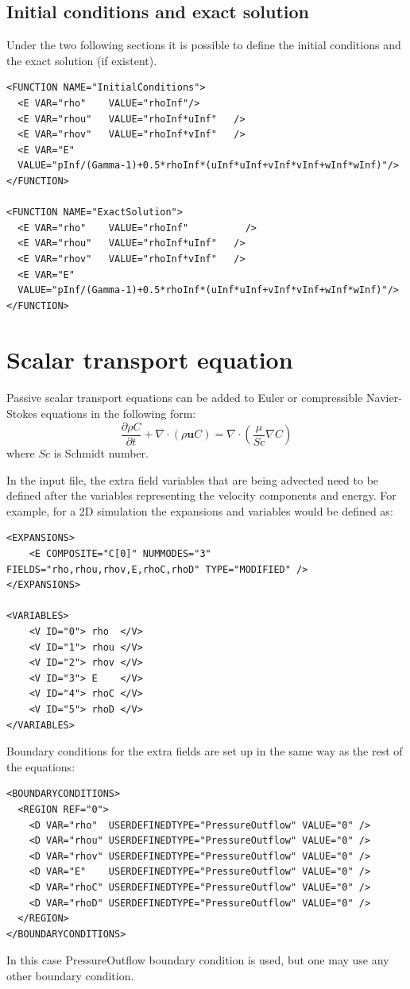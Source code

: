 \subsection*{Initial conditions and exact solution}
Under the two following sections it is possible to define the initial conditions and the exact solution (if existent).
\begin{lstlisting}[style=XmlStyle]
<FUNCTION NAME="InitialConditions">
  <E VAR="rho"    VALUE="rhoInf"/>
  <E VAR="rhou"   VALUE="rhoInf*uInf"   />
  <E VAR="rhov"   VALUE="rhoInf*vInf"   />
  <E VAR="E"
  VALUE="pInf/(Gamma-1)+0.5*rhoInf*(uInf*uInf+vInf*vInf+wInf*wInf)"/>
</FUNCTION>

<FUNCTION NAME="ExactSolution">
  <E VAR="rho"    VALUE="rhoInf"          />
  <E VAR="rhou"   VALUE="rhoInf*uInf"   />
  <E VAR="rhov"   VALUE="rhoInf*vInf"   />
  <E VAR="E"
  VALUE="pInf/(Gamma-1)+0.5*rhoInf*(uInf*uInf+vInf*vInf+wInf*wInf)"/>
</FUNCTION>
\end{lstlisting}

\section{Scalar transport equation}
Passive scalar transport equations can be added to Euler or compressible Navier-Stokes equations in the following form:
\begin{equation}
\dfrac{\partial \rho C }{\partial t} + \nabla \cdot (\rho \mathbf{u} C ) = \nabla \cdot \left(\dfrac{\mu}{Sc} \nabla C \right)
\end{equation}
where $Sc$ is Schmidt number. 

In the input file, the extra field variables that are being advected need to be defined after the variables
representing the velocity components and energy. For example, for
a 2D simulation the expansions and variables would be defined as:
\begin{lstlisting}[style=XMLStyle]
<EXPANSIONS>
    <E COMPOSITE="C[0]" NUMMODES="3" FIELDS="rho,rhou,rhov,E,rhoC,rhoD" TYPE="MODIFIED" />
</EXPANSIONS>

<VARIABLES>
    <V ID="0"> rho  </V>
    <V ID="1"> rhou </V>
    <V ID="2"> rhov </V>
    <V ID="3"> E    </V>
    <V ID="4"> rhoC </V>
    <V ID="5"> rhoD </V>
</VARIABLES>
\end{lstlisting}

Boundary conditions for the extra fields are set up in the same way as the rest of the equations:
\begin{lstlisting}[style=XMLStyle]
<BOUNDARYCONDITIONS>
  <REGION REF="0">
    <D VAR="rho"  USERDEFINEDTYPE="PressureOutflow" VALUE="0" />
    <D VAR="rhou" USERDEFINEDTYPE="PressureOutflow" VALUE="0" />
    <D VAR="rhov" USERDEFINEDTYPE="PressureOutflow" VALUE="0" />
    <D VAR="E"    USERDEFINEDTYPE="PressureOutflow" VALUE="0" />
    <D VAR="rhoC" USERDEFINEDTYPE="PressureOutflow" VALUE="0" />
    <D VAR="rhoD" USERDEFINEDTYPE="PressureOutflow" VALUE="0" />
  </REGION>
</BOUNDARYCONDITIONS>
\end{lstlisting}
In this case PressureOutflow boundary condition is used, but one may use any other boundary condition.

